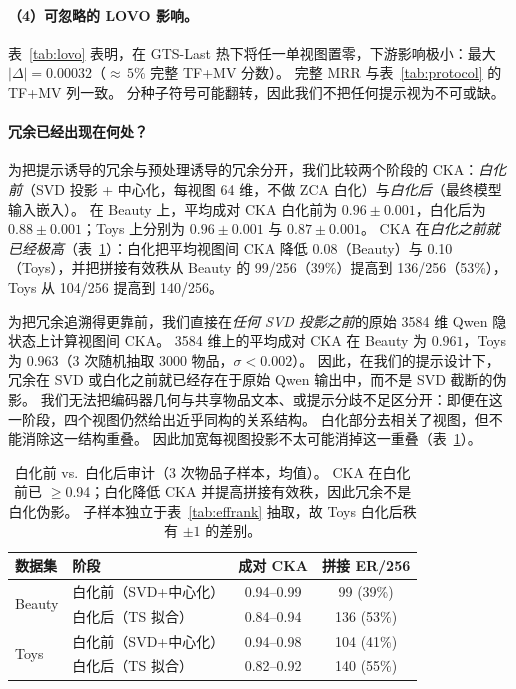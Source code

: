 \documentclass[sigconf,natbib=true,anonymous]{acmart}
\newcommand{\tfmv}{\textsc{TF+MV}\xspace}
\begin{document}
\paragraph{（4）可忽略的 LOVO 影响。}
表~\ref{tab:lovo} 表明，在 GTS-Last 热下将任一单视图置零，下游影响极小：最大 $|\Delta|{=}0.00032$（${\approx}\,5\%$ 完整 \tfmv 分数）。
完整 MRR 与表~\ref{tab:protocol} 的 \tfmv 列一致。
分种子符号可能翻转，因此我们不把任何提示视为不可或缺。

\paragraph{冗余已经出现在何处？}
为把提示诱导的冗余与预处理诱导的冗余分开，我们比较两个阶段的 CKA：\emph{白化前}（SVD 投影 + 中心化，每视图 64 维，不做 ZCA 白化）与\emph{白化后}（最终模型输入嵌入）。
在 Beauty 上，平均成对 CKA 白化前为 $0.96\pm0.001$，白化后为 $0.88\pm0.001$；Toys 上分别为 $0.96\pm0.001$ 与 $0.87\pm0.001$。
CKA 在\emph{白化之前就已经极高}（表~\ref{tab:cka-prepost}）：白化把平均视图间 CKA 降低 0.08（Beauty）与 0.10（Toys），并把拼接有效秩从 Beauty 的 99/256（39\%）提高到 136/256（53\%），Toys 从 104/256 提高到 140/256。

为把冗余追溯得更靠前，我们直接在\emph{任何 SVD 投影之前}的原始 3584 维 Qwen 隐状态上计算视图间 CKA。
3584 维上的平均成对 CKA 在 Beauty 为 $0.961$，Toys 为 $0.963$（3 次随机抽取 3000 物品，$\sigma < 0.002$）。
因此，在我们的提示设计下，冗余在 SVD 或白化之前就已经存在于原始 Qwen 输出中，而不是 SVD 截断的伪影。
我们无法把编码器几何与共享物品文本、或提示分歧不足区分开：即便在这一阶段，四个视图仍然给出近乎同构的关系结构。
白化部分去相关了视图，但不能消除这一结构重叠。
因此加宽每视图投影不太可能消掉这一重叠（表~\ref{tab:cka-prepost}）。

\begin{table}[t]
\centering
\caption{%
白化前 vs.\ 白化后审计（3 次物品子样本，均值）。
CKA 在白化前已 $\ge$0.94；白化降低 CKA 并提高拼接有效秩，因此冗余不是白化伪影。
子样本独立于表~\ref{tab:effrank} 抽取，故 Toys 白化后秩有 $\pm 1$ 的差别。%
}
\label{tab:cka-prepost}
\small
\begin{tabular}{@{}llcc@{}}
\toprule
数据集 & 阶段 & 成对 CKA & 拼接 ER/256 \\
\midrule
\multirow{2}{*}{Beauty}
 & 白化前（SVD+中心化）  & 0.94--0.99 & 99 (39\%) \\
 & 白化后（TS 拟合）     & 0.84--0.94 & 136 (53\%) \\
\midrule
\multirow{2}{*}{Toys}
 & 白化前（SVD+中心化）  & 0.94--0.98 & 104 (41\%) \\
 & 白化后（TS 拟合）     & 0.82--0.92 & 140 (55\%) \\
\bottomrule
\end{tabular}
\end{table}
\end{document}
